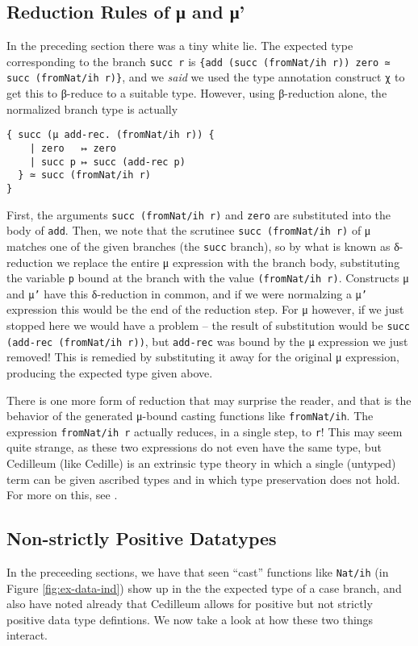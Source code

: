 \documentclass{article}
\begin{document}
\subsection{Reduction Rules of μ and μ'}
In the preceding section there was a tiny white lie. The expected type
corresponding to the branch \texttt{succ r} is \texttt{\{add (succ (fromNat/ih
  r)) zero ≃ succ (fromNat/ih r)\}}, and we \textit{said} we used the type annotation
construct \texttt{χ} to get this to β-reduce to a suitable type. However, using
β-reduction alone, the normalized branch type is actually
\begin{verbatim}
{ succ (μ add-rec. (fromNat/ih r)) {
    | zero   ↦ zero
    | succ p ↦ succ (add-rec p)
  } ≃ succ (fromNat/ih r)
}
\end{verbatim}
First, the arguments \texttt{succ (fromNat/ih r)} and \texttt{zero} are
substituted into the body of \texttt{add}. Then, we note that the scrutinee
\texttt{succ (fromNat/ih r)} of μ matches one of the given branches (the
\texttt{succ} branch), so by what is known as δ-reduction we replace the entire
μ expression with the branch body, substituting the variable \texttt{p} bound at
the branch with the value \texttt{(fromNat/ih r)}. Constructs μ and \texttt{μ'}
have this δ-reduction in common, and if we were normalzing a \texttt{μ'}
expression this would be the end of the reduction step. For μ however, if we
just stopped here we would have a problem -- the result of substitution would be
\texttt{succ (add-rec (fromNat/ih r))}, but \texttt{add-rec} was bound by the
\texttt{μ} expression we just removed! This is remedied by substituting it away
for the original μ expression, producing the expected type given above.

There is one more form of reduction that may surprise the reader, and that is
the behavior of the generated μ-bound casting functions like
\texttt{fromNat/ih}. The expression \texttt{fromNat/ih r} actually reduces, in a
single step, to \texttt{r}! This may seem quite strange, as these two
expressions do not even have the same type, but Cedilleum (like Cedille) is an
extrinsic type theory in which a single (untyped) term can be given ascribed
types and in which type preservation does not hold. For more on this, see
\cite{St18_Cedille-Syntax-Semantics}.

\subsection{Non-strictly Positive Datatypes}
\label{sec:positive-data}
In the preceeding sections, we have that seen ``cast'' functions like
\texttt{Nat/ih} (in Figure \ref{fig:ex-data-ind}) show up in the the expected
type of a case branch, and also have noted already that Cedilleum allows for
positive but not strictly positive data type defintions. We now take a look at
how these two things interact.
\end{document}
